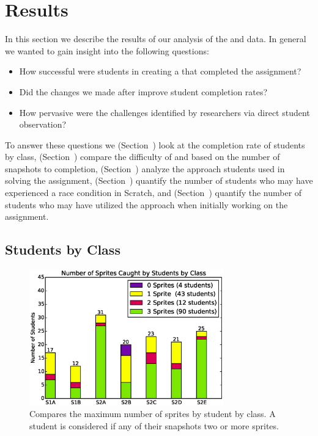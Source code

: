 \section{Results}
In this section we describe the results of our analysis of the \sone{} and
\stwo{} data. In general we wanted to gain insight into the following
questions:

\begin{itemize}
\item How successful were students in creating a \sprogram{} that completed the
  assignment?
\item Did the changes we made after \sone{} improve student completion rates?
\item How pervasive were the challenges identified by researchers via direct
  student observation?
\end{itemize}

To answer these questions we (Section~) look at the
completion rate of students by class, (Section~)
compare the difficulty of \sone{} and \stwo{} based on the number of snapshots
to completion, (Section~) analyze the approach students
used in solving the assignment, (Section~) quantify the
number of students who may have experienced a race condition in Scratch, and
(Section~) quantify the number of students who may have
utilized the \dce{} approach when initially working on the assignment.


\subsection{Students by Class}

\begin{figure}[!t]
\centering
\includegraphics[width=3.3in]{graphs/by_class_students.eps}
\caption{Compares the maximum number of sprites \caught{} by student by
  class. A student is considered \com{} if any of their snapshots 
  two or more sprites.}
\end{figure}

